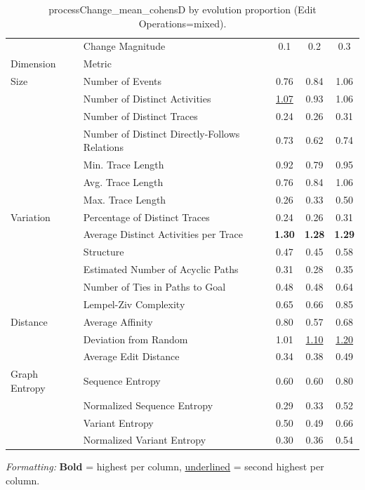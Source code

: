 \begin{table}[H]
\centering
\scriptsize
\caption{processChange_mean_cohensD by evolution proportion (Edit Operations=mixed).}
\label{tab:processchange-mean-cohensd-by-evolutionproportion}
\setlength{\tabcolsep}{2pt}  %
\begin{tabular}{llccc}
\toprule
              & Change Magnitude &  0.1 &  0.2 &  0.3 \\
Dimension & Metric &      &      &      \\
\midrule
Size & Number of Events & 0.76 & 0.84 & 1.06 \\
              & Number of Distinct Activities & \underline{1.07} & 0.93 & 1.06 \\
              & Number of Distinct Traces & 0.24 & 0.26 & 0.31 \\
              & Number of Distinct Directly-Follows Relations & 0.73 & 0.62 & 0.74 \\
              & Min. Trace Length & 0.92 & 0.79 & 0.95 \\
              & Avg. Trace Length & 0.76 & 0.84 & 1.06 \\
              & Max. Trace Length & 0.26 & 0.33 & 0.50 \\
Variation & Percentage of Distinct Traces & 0.24 & 0.26 & 0.31 \\
              & Average Distinct Activities per Trace & \textbf{1.30} & \textbf{1.28} & \textbf{1.29} \\
              & Structure & 0.47 & 0.45 & 0.58 \\
              & Estimated Number of Acyclic Paths & 0.31 & 0.28 & 0.35 \\
              & Number of Ties in Paths to Goal & 0.48 & 0.48 & 0.64 \\
              & Lempel-Ziv Complexity & 0.65 & 0.66 & 0.85 \\
Distance & Average Affinity & 0.80 & 0.57 & 0.68 \\
              & Deviation from Random & 1.01 & \underline{1.10} & \underline{1.20} \\
              & Average Edit Distance & 0.34 & 0.38 & 0.49 \\
Graph Entropy & Sequence Entropy & 0.60 & 0.60 & 0.80 \\
              & Normalized Sequence Entropy & 0.29 & 0.33 & 0.52 \\
              & Variant Entropy & 0.50 & 0.49 & 0.66 \\
              & Normalized Variant Entropy & 0.30 & 0.36 & 0.54 \\
\bottomrule
\end{tabular}
\vspace{2pt}
\begin{minipage}{\linewidth}
\centering
\scriptsize
\tiny
\textit{Formatting:} \textbf{Bold} = highest per column, \underline{underlined} = second highest per column.
\end{minipage}
\end{table}
